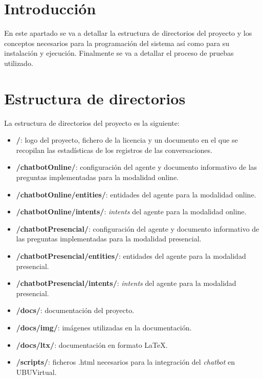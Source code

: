 
\section{Introducción}

En este apartado se va a detallar la estructura de directorios del proyecto y los conceptos necesarios para la programación del sistema así como para su instalación y ejecución. Finalmente se va a detallar el proceso de pruebas utilizado.

\section{Estructura de directorios}

La estructura de directorios del proyecto es la siguiente:

\begin{itemize}
	\tightlist
	\item
	\textbf{/}: logo del proyecto, fichero de la licencia y un documento en el que se recopilan las estadísticas de los registros de las conversaciones.
	\item
	\textbf{/chatbotOnline/}: configuración del agente y documento informativo de las preguntas implementadas para la modalidad online.
	\item
	\textbf{/chatbotOnline/entities/}: entidades del agente para la modalidad online.
	\item
	\textbf{/chatbotOnline/intents/}: \textit{intents} del agente para la modalidad online.
	\item
	\textbf{/chatbotPresencial/}: configuración del agente y documento informativo de las preguntas implementadas para la modalidad presencial.
	\item
	\textbf{/chatbotPresencial/entities/}: entidades del agente para la modalidad presencial.
	\item
	\textbf{/chatbotPresencial/intents/}: \textit{intents} del agente para la modalidad presencial.
	\item
	\textbf{/docs/}: documentación del proyecto.
	\item
	\textbf{/docs/img/}: imágenes utilizadas en la documentación.
	\item
	\textbf{/docs/ltx/}: documentación en formato \LaTeX.
	\item
	\textbf{/scripts/}: ficheros .html necesarios para la integración del \textit{chatbot} en UBUVirtual.
\end{itemize}

